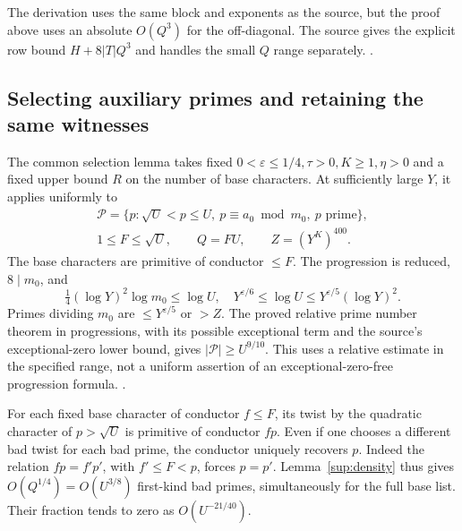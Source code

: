 \noindent
The derivation uses the same block and exponents as the source, but the proof above uses an absolute \(O(Q^3)\) for the off-diagonal. The source gives the explicit row bound \(H+8|T|Q^3\) and handles the small \(Q\) range separately. \quad
{}\quad
{}\quad
{}.

\subsection{Selecting auxiliary primes and retaining the same witnesses}

The common selection lemma takes fixed \(0<\varepsilon\le1/4,\tau>0,K\ge1,\eta>0\) and a fixed upper bound \(R\) on the number of base characters. At sufficiently large \(Y\), it applies uniformly to
\[
 \begin{gathered}\mathcal P=\{p:\sqrt U<p\le U,\ p\equiv a_0\bmod m_0,\ p\text{ prime}\},
 \\ 1\le F\le\sqrt U,\qquad Q=FU,\qquad Z=(Y^K)^{400}.\end{gathered}
\]
The base characters are primitive of conductor \(\le F\). The progression is reduced, \(8\mid m_0\), and
\[
 \tfrac14(\log Y)^2\log m_0\le\log U,\quad
 Y^{\varepsilon/6}\le\log U\le Y^{\varepsilon/5}(\log Y)^2 .
\]
Primes dividing \(m_0\) are \(\le Y^{\varepsilon/5}\) or \(>Z\). The proved relative prime number theorem in progressions, with its possible exceptional term and the source's exceptional-zero lower bound, gives \(|\mathcal P|\ge U^{9/10}\). This uses a relative estimate in the specified range, not a uniform assertion of an exceptional-zero-free progression formula. \quad
{}\quad
{}.

For each fixed base character of conductor \(f\le F\), its twist by the quadratic character of \(p>\sqrt U\) is primitive of conductor \(fp\). Even if one chooses a different bad twist for each bad prime, the conductor uniquely recovers \(p\). Indeed the relation \(fp=f'p'\), with \(f'\le F<p\), forces \(p=p'\). Lemma~\ref{sup:density} thus gives \(O(Q^{1/4})=O(U^{3/8})\) first-kind bad primes, simultaneously for the full base list. Their fraction tends to zero as \(O(U^{-21/40})\). 

